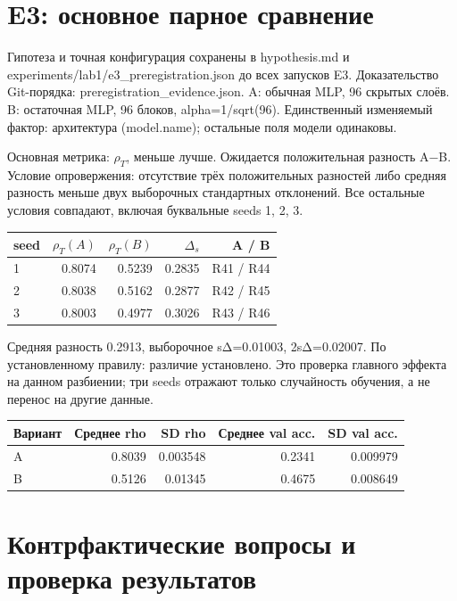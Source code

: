 \documentclass[10pt,a4paper]{article}
\begin{document}
\section{E3: основное парное сравнение}

Гипотеза и точная конфигурация сохранены в hypothesis.md и experiments/lab1/e3\_preregistration.json до всех запусков E3. Доказательство Git-порядка: preregistration\_evidence.json. A: обычная MLP, 96 скрытых слоёв. B: остаточная MLP, 96 блоков, alpha=1/sqrt(96). Единственный изменяемый фактор: архитектура (model.name); остальные поля модели одинаковы.

Основная метрика: $\rho_T$, меньше лучше. Ожидается положительная разность A−B. Условие опровержения: отсутствие трёх положительных разностей либо средняя разность меньше двух выборочных стандартных отклонений. Все остальные условия совпадают, включая буквальные seeds 1, 2, 3.

\begin{center}\small
\begin{tabular}{lrrrr}
\toprule
seed & $\rho_T(A)$ & $\rho_T(B)$ & $\Delta_s$ & A / B \\
\midrule
1 & 0.8074 & 0.5239 & 0.2835 & R41 / R44 \\
2 & 0.8038 & 0.5162 & 0.2877 & R42 / R45 \\
3 & 0.8003 & 0.4977 & 0.3026 & R43 / R46 \\
\bottomrule
\end{tabular}\end{center}

Средняя разность 0.2913, выборочное sΔ=0.01003, 2sΔ=0.02007. По установленному правилу: различие установлено. Это проверка главного эффекта на данном разбиении; три seeds отражают только случайность обучения, а не перенос на другие данные.

\begin{center}\small
\begin{tabular}{lrrrr}
\toprule
Вариант & Среднее rho & SD rho & Среднее val acc. & SD val acc. \\
\midrule
A & 0.8039 & 0.003548 & 0.2341 & 0.009979 \\
B & 0.5126 & 0.01345 & 0.4675 & 0.008649 \\
\bottomrule
\end{tabular}\end{center}

\section{Контрфактические вопросы и проверка результатов}
\end{document}
